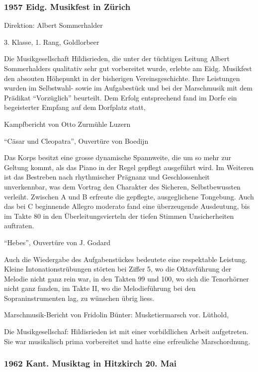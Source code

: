 \begin{history}
    \subsubsection*{1957 Eidg. Musikfest in Zürich}

    Direktion: Albert Sommerhalder

    3. Klasse, 1. Rang, Goldlorbeer

    Die Musikgesellschaft Hildisrieden, die unter der tüchtigen Leitung Albert
    Sommerhalders qualitativ sehr gut vorbereitet wurde, erlebte am Eidg.
    Musikfest den absouten Höhepunkt in der bisherigen Vereinsgeschichte. Ihre
    Leistungen wurden im Selbstwahl- sowie im Aufgabestück und bei der
    Marschmusik mit dem Prädikat \enquote{Vorzüglich} beurteilt. Dem Erfolg
    entsprechend fand im Dorfe ein begeisterter Empfang auf dem Dorfplatz statt,

    Kampfbericht von Otto Zurmühle Luzern

    \enquote{Cäsar und Cleopatra}, Ouvertüre von Boedijn

    Das Korps besitzt eine grosse dynamische Spannweite, die um so mehr zur
    Geltung kommt, als das Piano in der Regel gepflegt ausgeführt wird. Im
    Weiteren ist das Bestreben nach rhythmischer Prägnanz und Geschlossenheit
    unverkennbar, was dem Vortrag den Charakter des Sicheren, Selbstbewussten
    verleiht. Zwischen A und B erfreute die gepflegte, ausgeglichene Tongebung.
    Auch das bei C beginnende Allegro moderato fand eine überzeugende
    Ausdeutung, bis im Takte 80 in den Überleitungsvierteln der tiefen Stimmen
    Unsicherheiten auftraten.

    \enquote{Hebes}, Ouvertüre von J. Godard

    Auch die Wiedergabe des Aufgabenstückes bedeutete eine respektable Leistung.
    Kleine Intonationstrübungen störten bei Ziffer 5, wo die Oktavführung der
    Melodie nicht ganz rein war, in den Takten 99 und 100, wo sich die
    Tenorhörner nicht ganz fanden, im Takte II, wo die Melodieführung bei den
    Sopraninstrumenten lag, zu wünschen übrig liess.

    Marschmusik-Bericht von Fridolin Bünter: Musketiermarsch vor. Lüthold,

    Die Musikgesellschaf: Hildisrieden ist mit einer vorbildlichen Arbeit
    aufgetreten. Sie war musikalisch prima vorbereitet und hatte eine
    erfreuliche Marschordnung.

    \subsubsection*{    1962 Kant. Musiktag in Hitzkirch 20. Mai}


\end{history}
